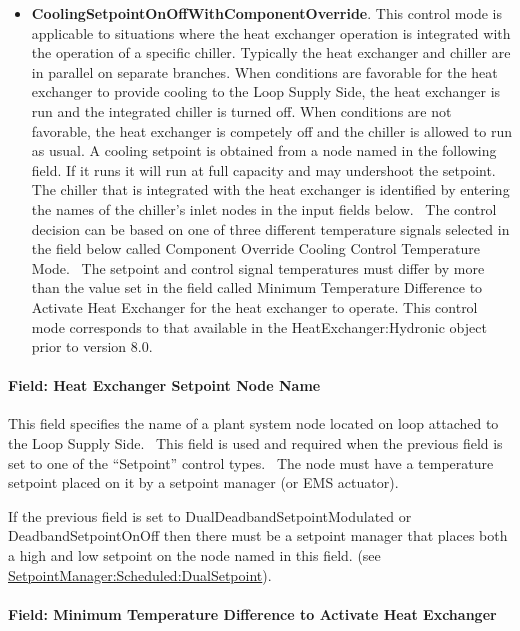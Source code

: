 \begin{itemize}
\item
  \textbf{CoolingSetpointOnOffWithComponentOverride}.  This control mode is applicable to situations where the heat exchanger operation is integrated with the operation of a specific chiller.  Typically the heat exchanger and chiller are in parallel on separate branches.  When conditions are favorable for the heat exchanger to provide cooling to the Loop Supply Side, the heat exchanger is run and the integrated chiller is turned off.  When conditions are not favorable, the heat exchanger is competely off and the chiller is allowed to run as usual.  A cooling setpoint is obtained from a node named in the following field.  If it runs it will run at full capacity and may undershoot the setpoint.  The chiller that is integrated with the heat exchanger is identified by entering the names of the chiller's inlet nodes in the input fields below.~ The control decision can be based on one of three different temperature signals selected in the field below called Component Override Cooling Control Temperature Mode.~ The setpoint and control signal temperatures must differ by more than the value set in the field called Minimum Temperature Difference to Activate Heat Exchanger for the heat exchanger to operate. This control mode corresponds to that available in the HeatExchanger:Hydronic object prior to version 8.0.
\end{itemize}

\paragraph{Field: Heat Exchanger Setpoint Node Name}\label{field-heat-exchanger-setpoint-node-name}

This field specifies the name of a plant system node located on loop attached to the Loop Supply Side.~ This field is used and required when the previous field is set to one of the ``Setpoint'' control types.~ The node must have a temperature setpoint placed on it by a setpoint manager (or EMS actuator).

If the previous field is set to DualDeadbandSetpointModulated or DeadbandSetpointOnOff then there must be a setpoint manager that places both a high and low setpoint on the node named in this field. (see \hyperref[setpointmanagerscheduleddualsetpoint]{SetpointManager:Scheduled:DualSetpoint}).

\paragraph{Field: Minimum Temperature Difference to Activate Heat Exchanger}\label{field-minimum-temperature-difference-to-activate-heat-exchanger}

